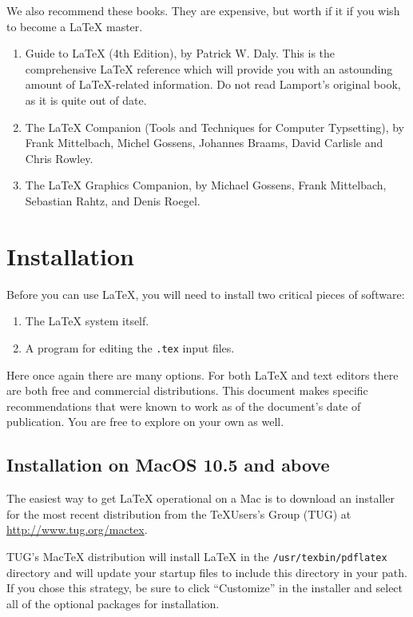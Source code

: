 We also recommend these books. They are expensive, but worth if it if
you wish to become a \LaTeX{} master.
\begin{enumerate}
\item Guide to \LaTeX{} (4th Edition), by Patrick W. Daly. This is the
  comprehensive \LaTeX{} reference which will provide you with an
  astounding amount of \LaTeX-related information. Do not read
  Lamport's original book, as it is quite out of date.
\item The \LaTeX{} Companion (Tools and Techniques for Computer
  Typsetting), by Frank Mittelbach, Michel Gossens, Johannes Braams,
  David Carlisle and Chris Rowley.
\item The \LaTeX{} Graphics Companion, by Michael Gossens, Frank
  Mittelbach, Sebastian Rahtz, and Denis Roegel.
\end{enumerate}

\section{Installation}
Before you can use \LaTeX{}, you will need to install two critical
pieces of software:
\begin{enumerate}
\item The \LaTeX{} system itself.
\item A program for editing the \verb+.tex+ input files.
\end{enumerate}

Here once again there are many options. For both \LaTeX{} and text editors
there are both free  and commercial distributions. This document makes specific
recommendations that were known to work as of the document's date of
publication. You are free to explore on your own as well.

\subsection{Installation on MacOS 10.5 and above}

The easiest way to get \LaTeX{} operational on a Mac is to download an
installer for the most recent distribution from the \TeX Users's Group (TUG) at
\url{http://www.tug.org/mactex}. 

TUG's Mac\TeX{} distribution will install \LaTeX{} in the
\verb+/usr/texbin/pdflatex+ directory and will update your startup files to
include this directory in your path. If you chose this strategy, be sure to
click ``Customize'' in the installer and select  all of the optional packages
for installation.

